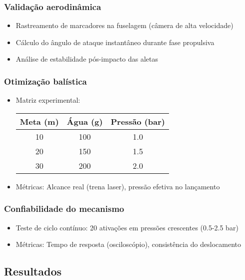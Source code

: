 \subsubsection{Validação aerodinâmica}
\begin{itemize}
    \item Rastreamento de marcadores na fuselagem (câmera de alta velocidade)
    \item Cálculo do ângulo de ataque instantâneo durante fase propulsiva
    \item Análise de estabilidade pós-impacto das aletas
\end{itemize}

\subsubsection{Otimização balística}
\begin{itemize}
    \item Matriz experimental: 
    \begin{table}[H]
        \centering
        \begin{tabular}{|c|c|c|}
            \hline
            Meta (m) & Água (g) & Pressão (bar) \\
            \hline
            10 & 100 & 1.0 \\
            20 & 150 & 1.5 \\
            30 & 200 & 2.0 \\
            \hline
        \end{tabular}
    \end{table}
    \item Métricas: Alcance real (trena laser), pressão efetiva no lançamento
\end{itemize}

\subsubsection{Confiabilidade do mecanismo}
\begin{itemize}
    \item Teste de ciclo contínuo: 20 ativações em pressões crescentes (0.5-2.5 bar)
    \item Métricas: Tempo de resposta (osciloscópio), consistência do deslocamento
\end{itemize}

\subsection{Resultados}
